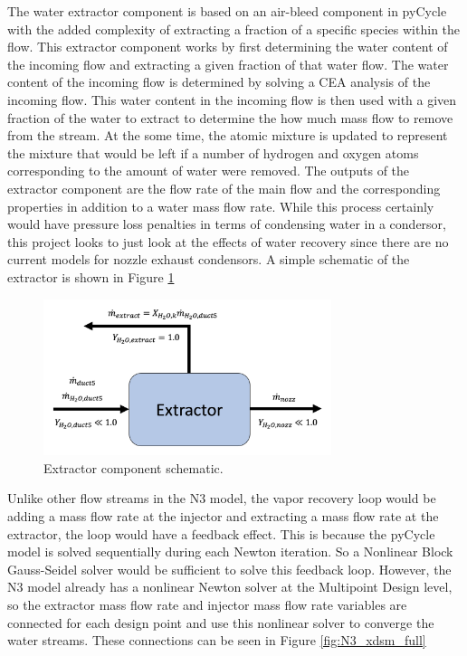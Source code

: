 \documentclass[12pt]{article}
\begin{document}
\noindent
The water extractor component is based on an air-bleed component in pyCycle with the added complexity of extracting a fraction of a specific species within the flow.
This extractor component works by first determining the water content of the incoming flow and extracting a given fraction of that water flow.
The water content of the incoming flow is determined by solving a CEA analysis of the incoming flow.
This water content in the incoming flow is then used with a given fraction of the water to extract to determine the how much mass flow to remove from the stream.
At the some time, the atomic mixture is updated to represent the mixture that would be left if a number of hydrogen and oxygen atoms corresponding to the amount of water were removed.
The outputs of the extractor component are the flow rate of the main flow and the corresponding properties in addition to a water mass flow rate.
While this process certainly would have pressure loss penalties in terms of condensing water in a condersor, this project looks to just look at the effects of water recovery since there are no current models for nozzle exhaust condensors.
A simple schematic of the extractor is shown in Figure \ref{fig:extractor}

\begin{figure}[!hbt]
    \centering
    \includegraphics[width=0.75\textwidth]{extractor.png}
    \caption{Extractor component schematic.}
    \label{fig:extractor}
\end{figure}

\noindent
Unlike other flow streams in the N3 model, the vapor recovery loop would be adding a mass flow rate at the injector and extracting a mass flow rate at the extractor, the loop would have a feedback effect.
This is because the pyCycle model is solved sequentially during each Newton iteration.
So a Nonlinear Block Gauss-Seidel solver would be sufficient to solve this feedback loop.
However, the N3 model already has a nonlinear Newton solver at the Multipoint Design level, so the extractor mass flow rate and injector mass flow rate variables are connected for each design point and use this nonlinear solver to converge the water streams.
These connections can be seen in Figure \ref{fig:N3_xdsm_full}
\end{document}
